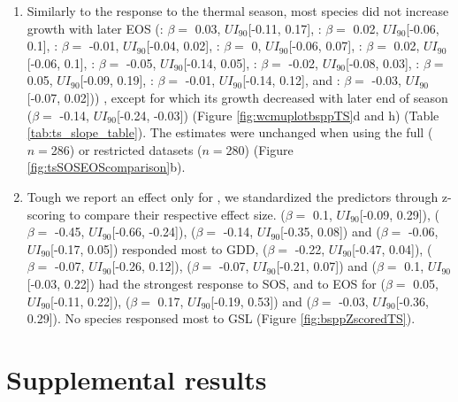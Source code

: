 \documentclass{article}\usepackage[]{graphicx}\usepackage[]{xcolor}
\begin{document}
\begin{enumerate}
\item Similarly to the response to the thermal season, most species did not increase growth with later EOS
(\Arub: $\beta = $ 0.03, $UI_{90}$[-0.11, 0.17],
\Asac: $\beta = $
0.02, $UI_{90}$[-0.06,
0.1],
\Afla: $\beta = $
-0.01, $UI_{90}$[-0.04,
0.02],
\Bnig: $\beta = $
0, $UI_{90}$[-0.06,
0.07],
\Cgla: $\beta = $
0.02, $UI_{90}$[-0.06,
0.1],
\Cova: $\beta = $
-0.05, $UI_{90}$[-0.14,
0.05],
\Pdel: $\beta = $
-0.02, $UI_{90}$[-0.08,
0.03],
\Qalb: $\beta = $
0.05, $UI_{90}$[-0.09,
0.19],
\Qrub: $\beta = $
-0.01, $UI_{90}$[-0.14,
0.12], and
\Tame: $\beta = $
-0.03, $UI_{90}$[-0.07,
0.02]))
, except {\Ball} for which its growth decreased with later end of season ($\beta = $
-0.14, $UI_{90}$[-0.24,
-0.03]) (Figure \ref{fig:wcmuplotbsppTS}d and h) (Table \ref{tab:ts_slope_table}). 
The estimates were unchanged when using the full ($n =$286) or restricted datasets ($n=$280) (Figure \ref{fig:tsSOSEOScomparison}b).

\item Tough we report an effect only for \Ball, we standardized the predictors through z-scoring to compare their respective effect size. 
\Asac ($\beta = $
0.1, 
$UI_{90}$[-0.09, 
0.29]),
\Ball ($\beta = $
-0.45, 
$UI_{90}$[-0.66, 
-0.24]),
\Cova ($\beta = $
-0.14, 
$UI_{90}$[-0.35, 
0.08]) and
\Pdel ($\beta = $
-0.06, 
$UI_{90}$[-0.17, 
0.05]) responded most to GDD,
\Arub ($\beta = $
-0.22, 
$UI_{90}$[-0.47, 
0.04]),
\Afla ($\beta = $
-0.07, 
$UI_{90}$[-0.26, 
0.12]),
\Bnig ($\beta = $
-0.07, 
$UI_{90}$[-0.21, 
0.07]) and
\Tame ($\beta = $
0.1, 
$UI_{90}$[-0.03, 
0.22]) had the strongest response to SOS, and to EOS for
\Cgla ($\beta = $
0.05, 
$UI_{90}$[-0.11, 
0.22]),
\Qalb ($\beta = $
0.17, 
$UI_{90}$[-0.19, 
0.53]) and
\Qrub ($\beta = $
-0.03, 
$UI_{90}$[-0.36, 
0.29]). No species responsed most to GSL (Figure \ref{fig:bsppZscoredTS}).

\end{enumerate}
\clearpage
\section*{Supplemental results}

\setcounter{table}{0}
\renewcommand{\thetable}{S\arabic{table}}
\setcounter{figure}{0}
\renewcommand{\thefigure}{S\arabic{figure}}
\end{document}
